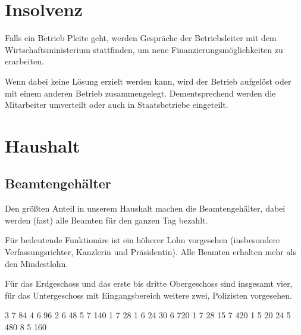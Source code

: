 \documentclass{sasbase}
\begin{document}
\section{Insolvenz}

Falls ein Betrieb Pleite geht, werden Gespräche der Betriebsleiter mit dem Wirtschaftsministerium
stattfinden, um neue Finanzierungsmöglichkeiten zu erarbeiten.

Wenn dabei keine Lösung erzielt werden kann, wird der Betrieb aufgelöst oder mit einem anderen
Betrieb zusammengelegt. Dementsprechend werden die Mitarbeiter umverteilt oder auch in
Staatsbetriebe eingeteilt.

\newpage

\section{Haushalt}

\subsection{Beamtengehälter}

Den größten Anteil in unserem Haushalt machen die Beamtengehälter, dabei werden (fast) alle
Beamten für den ganzen Tag bezahlt.

Für bedeutende Funktionäre ist ein höherer Lohn vorgesehen (insbesondere Verfassungsrichter, Kanzlerin und Präsidentin). Alle Beamten erhalten mehr als den Mindestlohn.

Für das Erdgeschoss und das erste bis dritte Obergeschoss sind insgesamt vier, für das Untergeschoss
mit Eingangsbereich weitere zwei, Polizisten vorgesehen.

\vspace{5mm}

\begin{lohnrechnung}
        {3}  {7} {84}
        {4}  {6} {96}
              {2}  {6} {48}
                  {5}  {7} {140}
                 {1}  {7} {28}
               {1}  {6} {24}
               {30} {6} {720}
     {1}  {7} {28}
           {15} {7} {420}
               {1}  {5} {20}
            {24} {5} {480}
                      {8}  {5} {160}
\end{lohnrechnung}

\addtocounter{beamten}{\thetotal}
\end{document}
